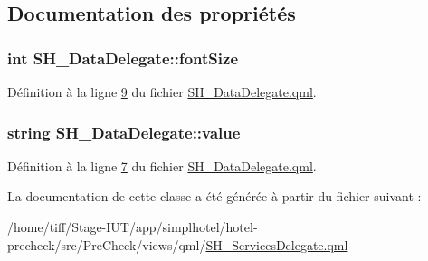 \subsection{Documentation des propriétés}
\hypertarget{classSH__DataDelegate_afbb41ad9b513c7f27e7b5ad90d82e95b}{
\subsubsection[{font\-Size}]{\setlength{\rightskip}{0pt plus 5cm}int S\-H\-\_\-\-Data\-Delegate\-::font\-Size\hspace{0.3cm}{\ttfamily [inherited]}}}\label{classSH__DataDelegate_afbb41ad9b513c7f27e7b5ad90d82e95b}


Définition à la ligne \hyperlink{SH__DataDelegate_8qml_source_l00009}{9} du fichier \hyperlink{SH__DataDelegate_8qml_source}{S\-H\-\_\-\-Data\-Delegate.\-qml}.

\hypertarget{classSH__DataDelegate_acb9da3c73493c88865e08d9575f26482}{
\subsubsection[{value}]{\setlength{\rightskip}{0pt plus 5cm}string S\-H\-\_\-\-Data\-Delegate\-::value\hspace{0.3cm}{\ttfamily [inherited]}}}\label{classSH__DataDelegate_acb9da3c73493c88865e08d9575f26482}


Définition à la ligne \hyperlink{SH__DataDelegate_8qml_source_l00007}{7} du fichier \hyperlink{SH__DataDelegate_8qml_source}{S\-H\-\_\-\-Data\-Delegate.\-qml}.



La documentation de cette classe a été générée à partir du fichier suivant \-:\begin{DoxyCompactItemize}
\item 
/home/tiff/\-Stage-\/\-I\-U\-T/app/simplhotel/hotel-\/precheck/src/\-Pre\-Check/views/qml/\hyperlink{SH__ServicesDelegate_8qml}{S\-H\-\_\-\-Services\-Delegate.\-qml}\end{DoxyCompactItemize}
